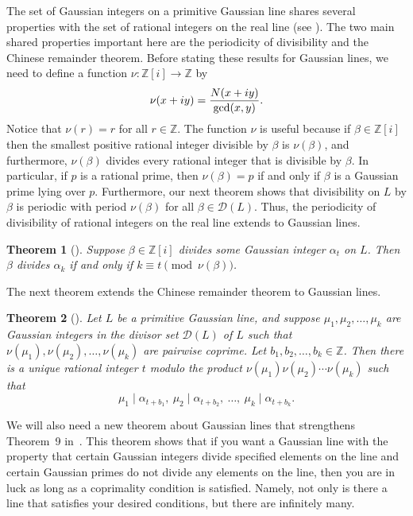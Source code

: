 \documentclass[11pt]{article}
\newtheorem{theorem}{Theorem}
\newcommand{\Z}{\mathbb{Z}}
\newcommand{\DL}{{\mathcal{D}}(L)}
\begin{document}
The set of Gaussian integers on a primitive Gaussian line shares several properties with the set of rational integers on the real line (see \cite{gethner, magness}).  The two main shared properties important here are the periodicity of divisibility and the Chinese remainder theorem.  Before stating these results for Gaussian lines, we need to define a function $\nu:\Z[i]\rightarrow \Z$ by 
\begin{equation}\label{morm}
\nu(x+iy) = \frac{N(x+iy)}{{\rm gcd}(x,y)}.
\end{equation}
 Notice that $\nu(r)=r$ for all $r\in \Z$. The function $\nu$  is useful  because if $\beta\in\Z[i]$ then the smallest positive rational integer divisible by $\beta$ is $\nu(\beta)$, and furthermore, $\nu(\beta)$ divides every rational integer that is divisible by $\beta$. In particular, if $p$ is a rational prime, then $\nu(\beta)=p$ if and only if $\beta$ is a Gaussian prime lying over $p$. Furthermore, our next theorem shows that divisibility on $L$ by $\beta$ is periodic with period $\nu(\beta)$ for all $\beta\in\DL$.  Thus, the periodicity of divisibility of rational integers on the real line extends to Gaussian lines.
 
 
\begin{theorem}[{\cite[Theorem 3]{magness}}]\label{periodicity}
Suppose $\beta\in\Z[i]$ divides some Gaussian integer $\alpha_t$ on $L$.  
Then  $\beta$ divides $\alpha_{k}$ if and only if $k \equiv t \pmod {\nu(\beta)}$.
\end{theorem}

The next theorem extends the Chinese remainder theorem to Gaussian lines.

\begin{theorem}[{\cite[Theorem 8]{magness}}] \label{crtGL}  Let $L$ be a primitive Gaussian line, and suppose
$\mu_1, \mu_2,\ldots, \mu_k$ are Gaussian integers in the divisor set $\DL$ of $L$ such  that $\nu(\mu_1),\nu(\mu_2), \ldots, \nu(\mu_k)$ are pairwise coprime. Let $b_1, b_2,\ldots, b_k\in\Z$. Then there is a unique rational integer $t$ modulo the product $\nu(\mu_1)\nu(\mu_2) \cdots \nu(\mu_k)$ such that
$$ \mu_1\mid\alpha_{t+b_1}, \ \mu_2\mid\alpha_{t+b_2}, \ \ldots, \ \mu_k\mid\alpha_{t+b_k}.$$
\end{theorem}

We will also need a new theorem about Gaussian lines that strengthens Theorem~9 in~\cite{magness}.  This theorem shows that if you want a Gaussian line  with the property that certain Gaussian integers divide specified elements on the line and  certain Gaussian  primes do not divide any elements on the line, then you are in luck as long as a coprimality condition is satisfied.  Namely, not only is there a line that satisfies your desired conditions, but there are infinitely many.
\end{document}
